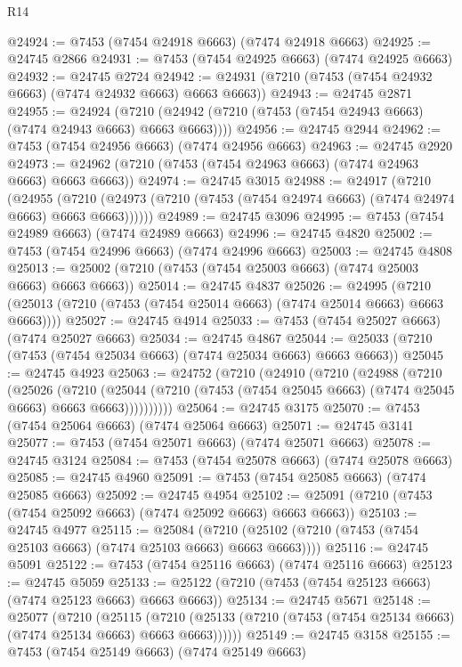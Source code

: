 \begin{lexlean}{R14}
\begin{coremodule}
{{{{{{{{{{{{{{{{{{{{{{{{{{{{{{{{{{{{{{{{{{{{{{{{{{{{{{{{{{{{{{{{{{{{{{{{{{{{{{{{{{@24924 := @7453 (@7454 @24918 @6663) (@7474 @24918 @6663)
@24925 := @24745 @2866
@24931 := @7453 (@7454 @24925 @6663) (@7474 @24925 @6663)
@24932 := @24745 @2724
@24942 := @24931 (@7210 (@7453 (@7454 @24932 @6663) (@7474 @24932 @6663) @6663 @6663))
@24943 := @24745 @2871
@24955 := @24924
    (@7210 (@24942 (@7210 (@7453 (@7454 @24943 @6663) (@7474 @24943 @6663) @6663 @6663))))
@24956 := @24745 @2944
@24962 := @7453 (@7454 @24956 @6663) (@7474 @24956 @6663)
@24963 := @24745 @2920
@24973 := @24962 (@7210 (@7453 (@7454 @24963 @6663) (@7474 @24963 @6663) @6663 @6663))
@24974 := @24745 @3015
@24988 := @24917
    (@7210
      (@24955
        (@7210 (@24973 (@7210 (@7453 (@7454 @24974 @6663) (@7474 @24974 @6663) @6663 @6663))))))
@24989 := @24745 @3096
@24995 := @7453 (@7454 @24989 @6663) (@7474 @24989 @6663)
@24996 := @24745 @4820
@25002 := @7453 (@7454 @24996 @6663) (@7474 @24996 @6663)
@25003 := @24745 @4808
@25013 := @25002 (@7210 (@7453 (@7454 @25003 @6663) (@7474 @25003 @6663) @6663 @6663))
@25014 := @24745 @4837
@25026 := @24995
    (@7210 (@25013 (@7210 (@7453 (@7454 @25014 @6663) (@7474 @25014 @6663) @6663 @6663))))
@25027 := @24745 @4914
@25033 := @7453 (@7454 @25027 @6663) (@7474 @25027 @6663)
@25034 := @24745 @4867
@25044 := @25033 (@7210 (@7453 (@7454 @25034 @6663) (@7474 @25034 @6663) @6663 @6663))
@25045 := @24745 @4923
@25063 := @24752
    (@7210
      (@24910
        (@7210
          (@24988
            (@7210
              (@25026
                (@7210
                  (@25044
                    (@7210 (@7453 (@7454 @25045 @6663) (@7474 @25045 @6663) @6663 @6663))))))))))
@25064 := @24745 @3175
@25070 := @7453 (@7454 @25064 @6663) (@7474 @25064 @6663)
@25071 := @24745 @3141
@25077 := @7453 (@7454 @25071 @6663) (@7474 @25071 @6663)
@25078 := @24745 @3124
@25084 := @7453 (@7454 @25078 @6663) (@7474 @25078 @6663)
@25085 := @24745 @4960
@25091 := @7453 (@7454 @25085 @6663) (@7474 @25085 @6663)
@25092 := @24745 @4954
@25102 := @25091 (@7210 (@7453 (@7454 @25092 @6663) (@7474 @25092 @6663) @6663 @6663))
@25103 := @24745 @4977
@25115 := @25084
    (@7210 (@25102 (@7210 (@7453 (@7454 @25103 @6663) (@7474 @25103 @6663) @6663 @6663))))
@25116 := @24745 @5091
@25122 := @7453 (@7454 @25116 @6663) (@7474 @25116 @6663)
@25123 := @24745 @5059
@25133 := @25122 (@7210 (@7453 (@7454 @25123 @6663) (@7474 @25123 @6663) @6663 @6663))
@25134 := @24745 @5671
@25148 := @25077
    (@7210
      (@25115
        (@7210 (@25133 (@7210 (@7453 (@7454 @25134 @6663) (@7474 @25134 @6663) @6663 @6663))))))
@25149 := @24745 @3158
@25155 := @7453 (@7454 @25149 @6663) (@7474 @25149 @6663)
}}}}}}}}}}}}}}}}}}}}}}}}}}}}}}}}}}}}}}}}}}}}}}}}}}}}}}}}}}}}}}}}}}}}}}}}}}}}}}}}}}
\end{coremodule}
\end{lexlean}
